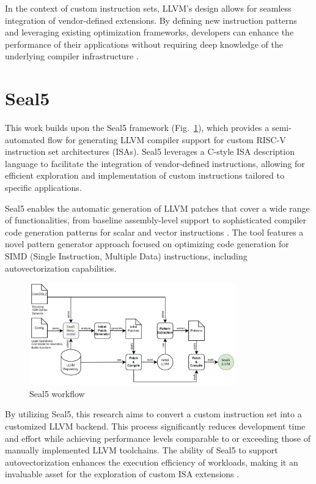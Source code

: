 In the context of custom instruction sets, LLVM's design allows for seamless integration of vendor-defined extensions. By defining new instruction patterns and leveraging existing optimization frameworks, developers can enhance the performance of their applications without requiring deep knowledge of the underlying compiler infrastructure \cite{llvm}.

\section{Seal5}

This work builds upon the Seal5 framework (Fig.~\ref{fig:seal5}), which provides a semi-automated flow for generating LLVM compiler support for custom RISC-V instruction set architectures (ISAs). Seal5 leverages a C-style ISA description language to facilitate the integration of vendor-defined instructions, allowing for efficient exploration and implementation of custom instructions tailored to specific applications.

Seal5 enables the automatic generation of LLVM patches that cover a wide range of functionalities, from baseline assembly-level support to sophisticated compiler code generation patterns for scalar and vector instructions . The tool features a novel pattern generator approach focused on optimizing code generation for SIMD (Single Instruction, Multiple Data) instructions, including autovectorization capabilities.

\begin{figure}
    \centering
    \includegraphics[width=0.8\textwidth]{figures/seal5.png}
    \caption{Seal5 workflow \cite{Seal5}}
    \label{fig:seal5}
\end{figure}

By utilizing Seal5, this research aims to convert a custom instruction set into a customized LLVM backend. This process significantly reduces development time and effort while achieving performance levels comparable to or exceeding those of manually implemented LLVM toolchains. The ability of Seal5 to support autovectorization enhances the execution efficiency of workloads, making it an invaluable asset for the exploration of custom ISA extensions \cite{Seal5}.

